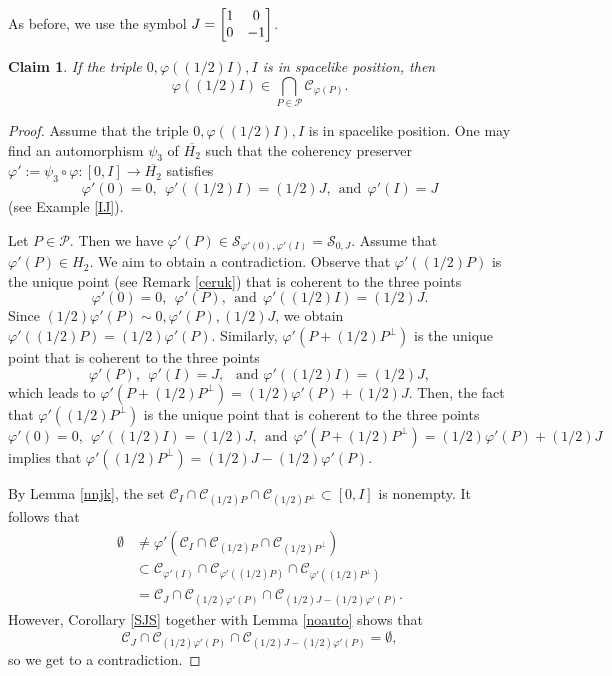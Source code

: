 \documentclass[10pt]{amsart}
\newtheorem{claim}[theorem]{Claim}
\theoremstyle{definition}
\theoremstyle{remark}
\numberwithin{subsection}{section}
\numberwithin{equation}{section}
\newcommand\cC{{\mathcal{C}}}
\newcommand\cP{{\mathcal{P}}}
\newcommand\oH{{\overline{H_2}}}
\begin{document}
As before, we use the symbol $J = \left[ \begin{matrix} 1 & 0 \cr 0 & -1 \cr \end{matrix} \right]$.

\begin{claim}
If the triple $0, \varphi((1/2)I), I$ is in spacelike position, then
\begin{equation}\label{cccc}
\varphi((1/2)I)\in \bigcap_{P\in \cP} \cC_{\varphi(P)}.
\end{equation}
\end{claim}
\begin{proof}
Assume that the triple $0, \varphi((1/2)I), I$ is in spacelike position.
One may find an automorphism $\psi_3$ of $\oH$ such that the coherency preserver $\varphi':=\psi_3\circ \varphi\colon [0, I]\to \oH$ satisfies 
\[
\varphi'(0)=0,\ \  \varphi'((1/2)I)=(1/2)J,\ \ \text{and} \ \ \varphi'(I)=J
\]
(see Example \ref{IJ}). 

Let $P\in \cP$. 
Then we have $\varphi'(P)\in {\mathcal{S}}_{\varphi'(0), \varphi'(I)} = {\mathcal{S}}_{0, J}$.
Assume that $\varphi'(P)\in H_2$. 
We aim to obtain a contradiction.
Observe that $\varphi'((1/2)P)$ is the unique point (see Remark \ref{ceruk}) that is coherent to the three points 
\[
\varphi'(0)=0,\ \ \varphi'(P),\ \ \text{and}\ \  \varphi'((1/2)I)=(1/2)J.
\] 
Since $(1/2)\varphi'(P)\sim 0, \varphi'(P), (1/2)J$, we obtain $\varphi'((1/2)P)=(1/2)\varphi'(P)$. 
Similarly, $\varphi'(P+(1/2)P^\perp)$ is the unique point that is coherent to the three points 
\[
\varphi'(P),\ \ \varphi'(I)=J,\ \ \text{ and }\varphi'((1/2)I)=(1/2)J,
\]
which leads to $\varphi'(P+(1/2)P^\perp)=(1/2)\varphi'(P)+(1/2)J$. 
Then, the fact that $\varphi'((1/2)P^\perp)$ is the unique point that is coherent to the three points 
\[
\varphi'(0)=0,\ \ \varphi'((1/2)I)=(1/2)J,\ \ \text{and}\ \ \varphi'(P+(1/2)P^\perp)=(1/2)\varphi'(P)+(1/2)J
\]
implies that $\varphi'((1/2)P^\perp)= (1/2)J-(1/2)\varphi'(P)$. 

By Lemma \ref{nnjk}, the set $\cC_I\cap \cC_{(1/2)P}\cap \cC_{(1/2)P^\perp}\subset [0, I]$ is nonempty. 
It follows that 
\[
\begin{split}
\emptyset &\neq \varphi'(\cC_I\cap \cC_{(1/2)P}\cap \cC_{(1/2)P^\perp})\\
&\subset \cC_{\varphi'(I)}\cap \cC_{\varphi'((1/2)P)}\cap \cC_{\varphi'((1/2)P^\perp)}\\
&=\cC_J\cap \cC_{(1/2)\varphi'(P)}\cap \cC_{(1/2)J-(1/2)\varphi'(P)}.
\end{split}
\]
However, Corollary \ref{SJS} together with Lemma \ref{noauto} shows that 
\[
\cC_J\cap\cC_{(1/2)\varphi'(P)}\cap \cC_{(1/2)J-(1/2)\varphi'(P)}=\emptyset,
\] so we get to a contradiction.


\end{proof}
\end{document}
